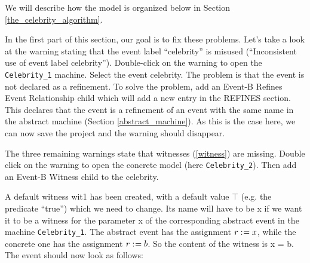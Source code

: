 We will describe how the model is organized below in Section \ref{the_celebrity_algorithm}.

In the first part of this section, our goal is to fix these problems. Let's take a look at the warning stating that the event label ``celebrity'' is misused (``Inconsistent use of event label celebrity''). Double-click on the warning to open the \texttt{Celebrity\_1} machine. Select the event \textsf{celebrity}. The problem is that the event is not declared as a refinement. To solve the problem, add an \textsf{Event-B Refines Event Relationship} child which will add a new entry in the \textsf{REFINES} section. This declares that the event is a refinement of an event with the same name in the abstract machine (Section \ref{abstract_machine}). As this is the case here, we can now save the project and the warning should disappear.


The three remaining warnings state that witnesses (\ref{witness}) are missing. Double click on the warning to open the concrete model (here \texttt{Celebrity\_2}). Then add an \textsf{Event-B Witness} child to the \textsf{celebrity}.

A default witness \textsf{wit1} has been created, with a default value \textsf{$\top$} (e.g. the predicate ``true'') which we need to change. Its name will have to be \textsf{x} if we want it to be a witness for the parameter \textsf{x} of the corresponding abstract event in the machine \texttt{Celebrity\_1}. The abstract event has the assignment \textsf{$r \mathrel{:\mkern1mu=} x$}, while the concrete one has the assignment \textsf{$r \mathrel{:\mkern1mu=} b$}. So the content of the witness is \textsf{x = b}. The event should now look as follows: 

\begin{description}
		\begin{description}
		\WhenGrd
			\begin{description}
			\end{description}
		\Witnesses
			\begin{description}
			\nItem{ x }{ x=b }
			\end{description}
		\ThenAct
			\begin{description}
			\nItemX{ act1 }{ r :=  b }
			\end{description}
		\EndAct
		\end{description}
\end{description}


